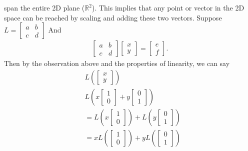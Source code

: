 \documentclass{report}
\begin{document}
\begin{itemize}
\[        \]
        span the entire 2D plane (\(\mathbb{R}^2\)). This implies that any point or vector in the 2D space can be reached by scaling and adding these two vectors.
        \bigbreak \noindent 
        Suppose $L = \begin{bmatrix} a & b \\ c & d\end{bmatrix} $
        \bigbreak \noindent 
        And
        \begin{align*}
            \begin{bmatrix} a & b \\ c & d \end{bmatrix} \begin{bmatrix} x \\ y\end{bmatrix} = \begin{bmatrix} e \\ f \end{bmatrix}
        .\end{align*}
        \bigbreak \noindent 
        Then by the observation above and the properties of linearity, we can say
        \begin{align*}
            &L\left( \begin{bmatrix}x \\y  \end{bmatrix}\right) \\
            &L\left(x \begin{bmatrix} 1 \\ 0 \end{bmatrix} + y \begin{bmatrix} 0 \\ 1 \end{bmatrix}\right) \\
            &=L\left(x \begin{bmatrix} 1 \\ 0 \end{bmatrix}\right) + L\left(y \begin{bmatrix} 0 \\ 1\end{bmatrix}\right) \\
            &=xL\left(\begin{bmatrix} 1 \\ 0 \end{bmatrix}\right) + yL\left(\begin{bmatrix} 0 \\ 1\end{bmatrix}\right)

\end{align*}
\end{itemize}
\end{document}
